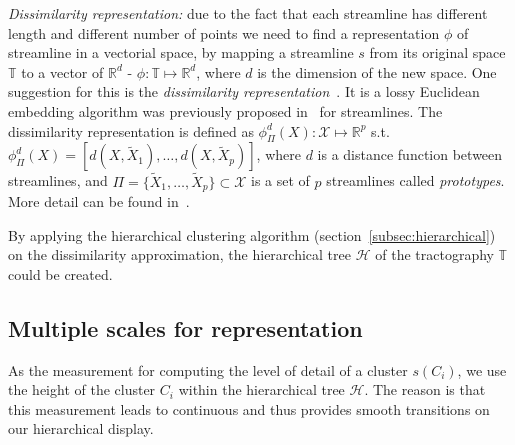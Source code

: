 \vspace{0.55mm}
\textit{Dissimilarity representation: }
due to the fact that 
each streamline has different length and different number of points
we need to find a representation $\phi$ of streamline in a vectorial space, by mapping a streamline $s$ from its original space $\mathbb{T}$ to a vector of $\mathbb{R}^d$ - $\phi : \mathbb{T} \mapsto \mathbb{R}^d$, where $d$ is the dimension of the new space. One suggestion for this is the \emph{dissimilarity representation}~\cite{pekalska2002generalized}. It is a lossy Euclidean embedding algorithm was previously proposed
in~\cite{olivetti2012approximation} for streamlines. The dissimilarity representation
is defined as $\phi_{\Pi}^d(X):\mathcal{X} \mapsto \mathbb{R}^p$ s.t. $\phi_{\Pi}^d(X) = [d(X,\tilde{X}_1) ,\ldots, d(X,\tilde{X}_p)]$, 
where $d$ is a distance function between streamlines, and $\Pi =
\{\tilde{X}_1, \ldots, \tilde{X}_p\} \subset \mathcal{X}$ is a set of
$p$ streamlines called \emph{prototypes}. %
More detail can be found in~\cite{olivetti2012approximation,pekalska2006prototype}.

\vspace{0.75mm}
By applying the hierarchical clustering algorithm (section~\ref{subsec:hierarchical}) on the dissimilarity approximation, the hierarchical tree $\mathcal{H}$ of the tractography $\mathbb{T}$ could be created.
\vspace{-2.75mm}
\subsection{Multiple scales for representation}\vspace{-1mm}
As the measurement for computing the level of detail of a cluster $s(C_i)$, we use the height of the cluster $C_i$ within the hierarchical tree $\mathcal{H}$. The reason is that this measurement leads to continuous and thus provides smooth transitions on our hierarchical display. 
 
